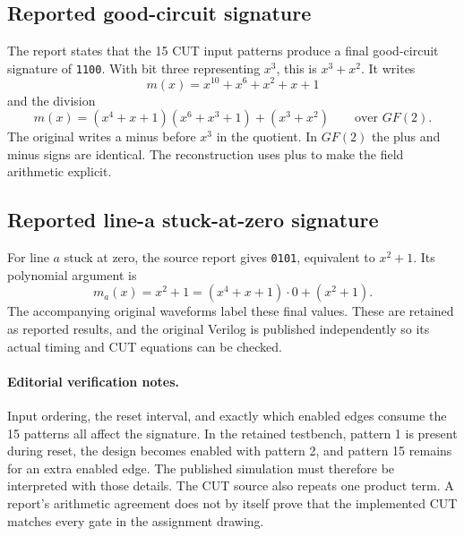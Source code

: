 \documentclass[11pt,a4paper]{article}
\newcommand{\bits}[1]{\texttt{#1}}
\begin{document}
\subsection{Reported good-circuit signature}
The report states that the 15 CUT input patterns produce a final good-circuit signature of \bits{1100}. With bit three representing $x^3$, this is $x^3+x^2$. It writes
\[
m(x)=x^{10}+x^6+x^2+x+1
\]
and the division
\[
m(x)=(x^4+x+1)(x^6+x^3+1)+(x^3+x^2)
\qquad\text{over }GF(2).
\]
The original writes a minus before $x^3$ in the quotient. In $GF(2)$ the plus and minus signs are identical. The reconstruction uses plus to make the field arithmetic explicit.

\subsection{Reported line-a stuck-at-zero signature}
For line $a$ stuck at zero, the source report gives \bits{0101}, equivalent to $x^2+1$. Its polynomial argument is
\[
m_a(x)=x^2+1=(x^4+x+1)\cdot0+(x^2+1).
\]
The accompanying original waveforms label these final values. These are retained as reported results, and the original Verilog is published independently so its actual timing and CUT equations can be checked.

\paragraph{Editorial verification notes.}
Input ordering, the reset interval, and exactly which enabled edges consume the 15 patterns all affect the signature.
In the retained testbench, pattern 1 is present during reset, the design becomes enabled with pattern 2, and pattern 15 remains for an extra enabled edge. The published simulation must therefore be interpreted with those details.
The CUT source also repeats one product term. A report's arithmetic agreement does not by itself prove that the implemented CUT matches every gate in the assignment drawing.
\end{document}
